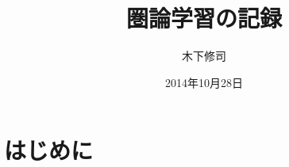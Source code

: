\documentclass{ltjsarticle}
\begin{document}
\title{圏論学習の記録}
\author{木下修司}
\date{2014年10月28日}
\maketitle

\section{はじめに}
\end{document}
